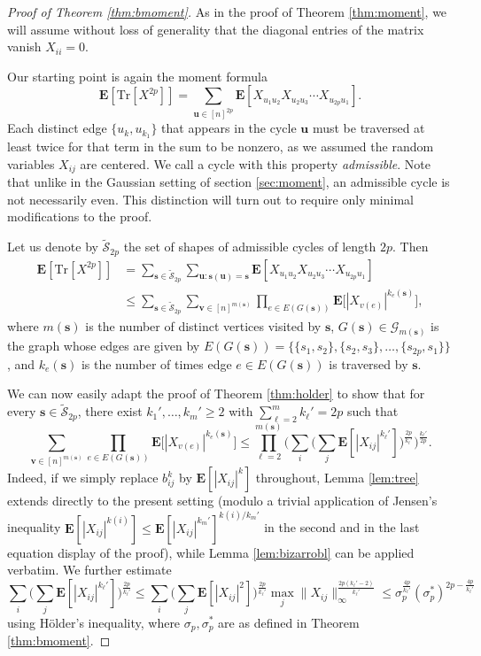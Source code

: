 \documentclass[10pt,reqno]{amsart}
\theoremstyle{definition}
\numberwithin{equation}{section}
\numberwithin{figure}{section}
\numberwithin{table}{section}
\begin{document}
\begin{proof}[Proof of Theorem \ref{thm:bmoment}]
As in the proof of Theorem \ref{thm:moment}, we will assume without loss
of generality that the diagonal entries of the matrix vanish $X_{ii}=0$.

Our starting point is again the moment formula
$$
	\mathbf{E}[\mathrm{Tr}[X^{2p}]] =
	\sum_{\mathbf{u}\in[n]^{2p}}
	\mathbf{E}[X_{u_1u_2}X_{u_2u_3}\cdots X_{u_{2p}u_1}].
$$
Each distinct edge $\{u_k,u_{k_1}\}$ that appears in the cycle 
$\mathbf{u}$ must be traversed at least twice for that term 
in the sum to be nonzero, as we assumed the random variables $X_{ij}$ are 
centered. We call a cycle with this property \emph{admissible}. Note 
that unlike in the Gaussian setting of section \ref{sec:moment}, an 
admissible cycle is not necessarily even. This distinction will turn out 
to require only minimal modifications to the proof.

Let us denote by $\mathcal{\tilde S}_{2p}$ the set of shapes of admissible 
cycles of length $2p$. Then 
\begin{align*}
	\mathbf{E}[\mathrm{Tr}[X^{2p}]] &=
	\sum_{\mathbf{s}\in\mathcal{\tilde S}_{2p}}
	\sum_{\mathbf{u}:\mathbf{s}(\mathbf{u})=\mathbf{s}}
	\mathbf{E}[X_{u_1u_2}X_{u_2u_3}\cdots X_{u_{2p}u_1}]  \\
	&\le
	\sum_{\mathbf{s}\in\mathcal{\tilde S}_{2p}}
	\sum_{\mathbf{v}\in[n]^{m(\mathbf{s})}}
	\prod_{e\in E(G(\mathbf{s}))}
	\mathbf{E}\big[|X_{v(e)}|^{k_e(\mathbf{s})}\big],
\end{align*}
where $m(\mathbf{s})$ is the number of distinct vertices visited by 
$\mathbf{s}$, $G(\mathbf{s})\in\mathcal{G}_{m(\mathbf{s})}$ is the
graph whose edges are given by 
$E(G(\mathbf{s}))=\{\{s_1,s_2\},\{s_2,s_3\},\ldots,\{s_{2p},s_1\}\}$, and
$k_e(\mathbf{s})$ is the number of times edge
$e\in E(G(\mathbf{s}))$ is traversed by $\mathbf{s}$.

We can now easily adapt the proof of Theorem \ref{thm:holder} to show that 
for every $\mathbf{s}\in\mathcal{\tilde S}_{2p}$, there exist
$k_1',\ldots,k_m'\ge 2$ with $\sum_{\ell=2}^m k_\ell'=2p$ such that
$$
	\sum_{\mathbf{v}\in[n]^{m(\mathbf{s})}}
        \prod_{e\in E(G(\mathbf{s}))}
        \mathbf{E}\big[|X_{v(e)}|^{k_e(\mathbf{s})}\big]
	\le
	\prod_{\ell=2}^{m(\mathbf{s})} 
	\Bigg( \sum_i \Bigg( \sum_j
	\mathbf{E}[|X_{ij}|^{k_\ell'}]
	\Bigg)^{\frac{2p}{k_\ell'}}\Bigg)^{\frac{k_\ell'}{2p}}.
$$
Indeed, if we simply replace $b_{ij}^k$ by $\mathbf{E}[|X_{ij}|^k]$ 
throughout, Lemma \ref{lem:tree} extends directly to the 
present setting (modulo a trivial application of Jensen's inequality
$\mathbf{E}[|X_{ij}|^{k(i)}]\le \mathbf{E}[|X_{ij}|^{k_m'}]^{k(i)/k_m'}$
in the second and in the last equation display of the proof), while 
Lemma \ref{lem:bizarrobl} can be applied verbatim. We further estimate
$$
	\sum_i \Bigg( \sum_j
        \mathbf{E}[|X_{ij}|^{k_\ell'}]\Bigg)^{\frac{2p}{k_\ell'}} 
\!	\le
	\sum_i \Bigg( \sum_j
        \mathbf{E}[|X_{ij}|^2]\Bigg)^{\frac{2p}{k_\ell'}} 
\!	\max_j \|X_{ij}\|_\infty^{\frac{2p(k_\ell'-2)}{k_\ell'}}
\!	\le
	\sigma_p^{\frac{4p}{k_\ell'}}
	(\sigma_p^*)^{2p-\frac{4p}{k_\ell'}}
$$
using H\"older's inequality, where $\sigma_p,\sigma_p^*$ are as defined in
Theorem \ref{thm:bmoment}.


\end{proof}
\end{document}
